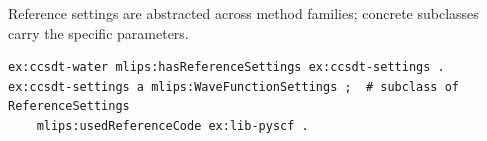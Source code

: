 Reference settings are abstracted across method families; concrete subclasses carry the specific parameters.
\begin{lstlisting}[language=turtle]
ex:ccsdt-water mlips:hasReferenceSettings ex:ccsdt-settings .
ex:ccsdt-settings a mlips:WaveFunctionSettings ;  # subclass of ReferenceSettings
    mlips:usedReferenceCode ex:lib-pyscf .
\end{lstlisting}
